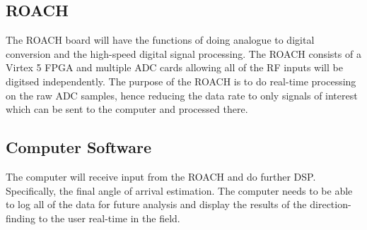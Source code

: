 \subsection{ROACH}
The ROACH board will have the functions of doing analogue to digital conversion and the high-speed digital signal processing. The ROACH consists of a Virtex 5 FPGA and multiple ADC cards allowing all of the RF inputs will be digitsed independently. The purpose of the ROACH is to do real-time processing on the raw ADC samples, hence reducing the data rate to only signals of interest which can be sent to the computer and processed there.

\subsection{Computer Software}
The computer will receive input from the ROACH and do further DSP. Specifically, the final angle of arrival estimation. The computer needs to be able to log all of the data for future analysis and display the results of the direction-finding to the user real-time in the field.


